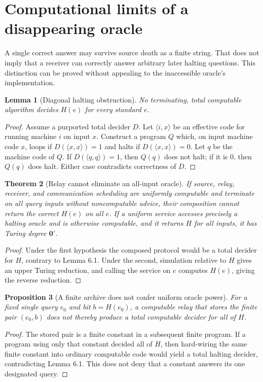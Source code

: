 \documentclass[11pt,letterpaper]{article}
\newtheorem{theorem}{Theorem}[section]\newtheorem{lemma}[theorem]{Lemma}\newtheorem{proposition}[theorem]{Proposition}\newtheorem{corollary}[theorem]{Corollary}\theoremstyle{definition}\newtheorem{definition}[theorem]{Definition}\newtheorem{example}[theorem]{Example}\newtheorem{remark}[theorem]{Remark}\newtheorem{conjecture}[theorem]{Conjecture}
\begin{document}
\section{Computational limits of a disappearing oracle}
A single correct answer may survive source death as a finite string. That does not imply that a receiver can correctly answer arbitrary later halting questions. This distinction can be proved without appealing to the inaccessible oracle's implementation.
\begin{lemma}[Diagonal halting obstruction]
No terminating, total computable algorithm decides $H(e)$ for every standard $e$.
\end{lemma}
\begin{proof}
Assume a purported total decider $D$. Let $\langle i,x\rangle$ be an effective code for running machine $i$ on input $x$. Construct a program $Q$ which, on input machine code $x$, loops if $D(\langle x,x\rangle)=1$ and halts if $D(\langle x,x\rangle)=0$. Let $q$ be the machine code of $Q$. If $D(\langle q,q\rangle)=1$, then $Q(q)$ does not halt; if it is $0$, then $Q(q)$ does halt. Either case contradicts correctness of $D$.
\end{proof}
\begin{theorem}[Relay cannot eliminate an all-input oracle]
If source, relay, receiver, and communication scheduling are uniformly computable and terminate on all query inputs without noncomputable advice, their composition cannot return the correct $H(e)$ on all $e$. If a uniform service accesses precisely a halting oracle and is otherwise computable, and it returns $H$ for all inputs, it has Turing degree $\mathbf 0'$.
\end{theorem}
\begin{proof}
Under the first hypothesis the composed protocol would be a total decider for $H$, contrary to Lemma 6.1. Under the second, simulation relative to $H$ gives an upper Turing reduction, and calling the service on $e$ computes $H(e)$, giving the reverse reduction.
\end{proof}
\begin{proposition}[A finite archive does not confer uniform oracle power]
For a fixed single query $e_0$ and bit $b=H(e_0)$, a computable relay that stores the finite pair $(e_0,b)$ does not thereby produce a total computable decider for all of $H$.
\end{proposition}
\begin{proof}
The stored pair is a finite constant in a subsequent finite program. If a program using only that constant decided all of $H$, then hard-wiring the same finite constant into ordinary computable code would yield a total halting decider, contradicting Lemma 6.1. This does not deny that a constant answers its one designated query.
\end{proof}
\end{document}
